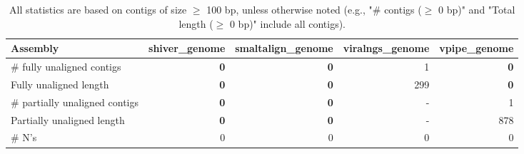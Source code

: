 \documentclass[12pt,a4paper]{article}
\begin{document}
\begin{table}[ht]
\begin{center}
\caption{All statistics are based on contigs of size $\geq$ 100 bp, unless otherwise noted (e.g., "\# contigs ($\geq$ 0 bp)" and "Total length ($\geq$ 0 bp)" include all contigs).}
\begin{tabular}{|l*{4}{|r}|}
\hline
Assembly & shiver\_genome & smaltalign\_genome & viralngs\_genome & vpipe\_genome \\ \hline
\# fully unaligned contigs & {\bf 0} & {\bf 0} & 1 & {\bf 0} \\ \hline
Fully unaligned length & {\bf 0} & {\bf 0} & 299 & {\bf 0} \\ \hline
\# partially unaligned contigs & {\bf 0} & {\bf 0} & - & 1 \\ \hline
Partially unaligned length & {\bf 0} & {\bf 0} & - & 878 \\ \hline
\# N's & 0 & 0 & 0 & 0 \\ \hline
\end{tabular}
\end{center}
\end{table}
\end{document}
